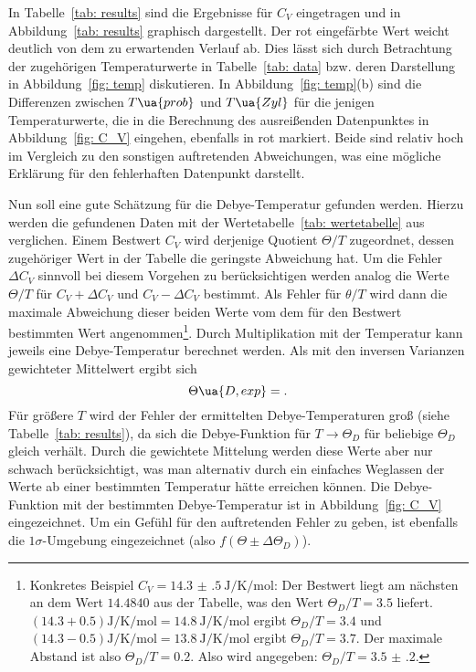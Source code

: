 

In Tabelle~\ref{tab: results} sind die Ergebnisse für $C_V$ eingetragen und in Abbildung~\ref{tab: results} graphisch dargestellt. 
Der rot eingefärbte Wert weicht deutlich von dem zu erwartenden Verlauf ab. Dies lässt sich durch Betrachtung der 
zugehörigen Temperaturwerte in Tabelle~\ref{tab: data} bzw. deren Darstellung in Abbildung~\ref{fig: temp} diskutieren. In Abbildung~\ref{fig: temp}(b)
sind die Differenzen zwischen $T\ua{prob}$ und $T\ua{Zyl}$ für die jenigen Temperaturwerte, die in die Berechnung des 
ausreißenden Datenpunktes in Abbildung~\ref{fig: C_V} eingehen, ebenfalls in rot markiert. Beide sind relativ hoch im Vergleich zu den 
sonstigen auftretenden Abweichungen, was eine mögliche Erklärung für den fehlerhaften Datenpunkt darstellt.  

Nun soll eine gute Schätzung für die Debye-Temperatur gefunden werden. Hierzu werden die gefundenen Daten mit der 
Wertetabelle~\ref{tab: wertetabelle} aus~\cite{anleitungV47} verglichen. Einem Bestwert $C_V$ wird derjenige Quotient $\Theta / T$ zugeordnet, dessen 
zugehöriger Wert in der Tabelle die geringste Abweichung hat. Um die Fehler $\Delta C_V$ sinnvoll bei diesem 
Vorgehen zu berücksichtigen werden analog die Werte $\Theta / T$ für $C_V + \Delta C_V$ und $C_V - \Delta C_V$ bestimmt. 
Als Fehler für $\theta / T$ wird dann die maximale Abweichung dieser beiden Werte vom dem für den Bestwert bestimmten 
Wert angenommen\footnote{Konkretes Beispiel $C_V = \SI{14.3(5)}{\joule\per\kelvin\per\mol}$:
Der Bestwert liegt am nächsten an dem Wert $\num{14.4840}$ aus der Tabelle, was den Wert $\Theta_D / T = \num{3.5}$ liefert. 
$(\num{14.3} + \num{0.5})\si{\joule\per\kelvin\per\mol} = \SI{14.8}{\joule\per\kelvin\per\mol}$ ergibt $\Theta_D / T = \num{3.4}$ und
$(\num{14.3} - \num{0.5})\si{\joule\per\kelvin\per\mol} = \SI{13.8}{\joule\per\kelvin\per\mol}$ ergibt $\Theta_D / T = \num{3.7}$. Der maximale 
Abstand ist also $\Theta_D / T = \num{0.2}$. Also wird angegeben: $\Theta_D / T = \num{3.5(2)}$.

}. Durch Multiplikation mit der Temperatur kann jeweils eine Debye-Temperatur berechnet werden. 
Als mit den inversen Varianzen gewichteter Mittelwert ergibt sich
\begin{equation}
        \Theta\ua{D, exp} = .
\end{equation}
Für größere $T$ wird der Fehler der ermittelten Debye-Temperaturen groß (siehe Tabelle~\ref{tab: results}), da sich die Debye-Funktion für 
$T \rightarrow \Theta_D$ für beliebige $\Theta_D$ gleich verhält. Durch die gewichtete Mittelung werden diese Werte aber nur schwach 
berücksichtigt, was man alternativ durch ein einfaches Weglassen der Werte ab einer bestimmten Temperatur hätte erreichen können.
Die Debye-Funktion mit der bestimmten Debye-Temperatur ist in Abbildung~\ref{fig: C_V} eingezeichnet. Um ein Gefühl für den 
auftretenden Fehler zu geben, ist ebenfalls die $1\sigma$-Umgebung eingezeichnet (also $f(\Theta \pm \Delta\Theta_D)$).

